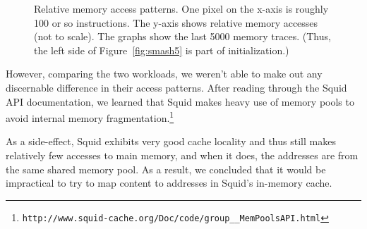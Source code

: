 \documentclass[11pt, oneside]{article}
\newcommand{\fref}[1]{Figure~\ref{#1}}
\begin{document}
\begin{figure}[h]
    \centering
	\caption{Relative memory access patterns. One pixel on the x-axis is 
	roughly 100 or so instructions. The y-axis shows relative memory accesses 
	(not to scale). The graphs show the last 5000 memory traces. (Thus, the 
	left side of \fref{fig:smash5} is part of initialization.)}
	\label{fig:smash}
\end{figure}

However, comparing the two workloads,
we weren't able to make out any discernable difference in their access
patterns. After reading through the Squid API documentation, we learned
that Squid makes heavy use of memory pools to avoid internal memory
fragmentation.\footnote{
{\tt http://www.squid-cache.org/Doc/code/group\_\_MemPoolsAPI.html}}


As a side-effect, Squid exhibits very good cache locality
and thus still makes relatively few accesses to main memory, and when
it does, the addresses are from the same shared memory pool. As a result,
we concluded that it would be impractical to try to map content to addresses
in Squid's in-memory cache.
\end{document}
